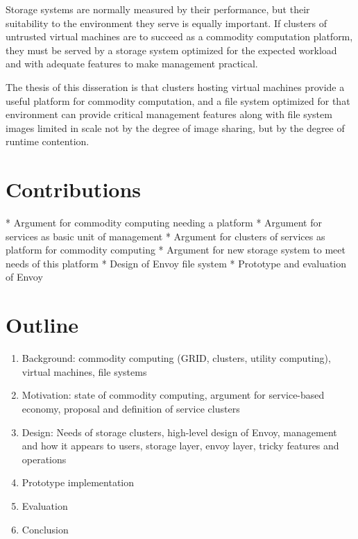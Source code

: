 Storage systems are normally measured by their performance, but their suitability to the environment they serve is equally important. If clusters of untrusted virtual machines are to succeed as a commodity computation platform, they must be served by a storage system optimized for the expected workload and with adequate features to make management practical.

The thesis of this disseration is that clusters hosting virtual machines provide a useful platform for commodity computation, and a file system optimized for that environment can provide critical management features along with file system images limited in scale not by the degree of image sharing, but by the degree of runtime contention.

\section{Contributions}

* Argument for commodity computing needing a platform
* Argument for services as basic unit of management
* Argument for clusters of services as platform for commodity computing
* Argument for new storage system to meet needs of this platform
* Design of Envoy file system
* Prototype and evaluation of Envoy

\section{Outline}
\begin{enumerate}
\item Background: commodity computing (GRID, clusters, utility computing), virtual machines, file systems
\item Motivation: state of commodity computing, argument for service-based economy, proposal and definition of service clusters
\item Design: Needs of storage clusters, high-level design of Envoy, management and how it appears to users, storage layer, envoy layer, tricky features and operations
\item Prototype implementation
\item Evaluation
\item Conclusion
\end{enumerate}
